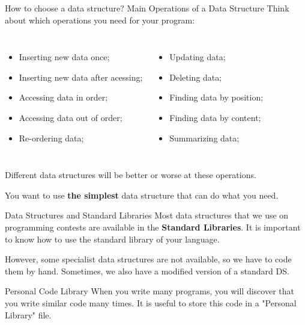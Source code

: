\begin{frame}{How to choose a data structure?}
  {Main Operations of a Data Structure}
  Think about which operations you need for your program:\medskip

  \begin{columns}
  \begin{itemize}
    \item Inserting new data once;
    \item Inserting new data after acessing;
    \item Accessing data in order;
    \item Accessing data out of order;
    \item Re-ordering data;
  \end{itemize}
  \begin{itemize}
    \item Updating data;
    \item Deleting data;
    \item Finding data by position;
    \item Finding data by content;
    \item Summarizing data;
  \end{itemize}
\end{columns}\bigskip

Different data structures will be better or
worse at these operations.\medskip

You want to use {\bf the simplest} data structure that can do what you need.
\end{frame}

\begin{frame}{Data Structures and Standard Libraries}
  Most data structures that we use on programming contests are available in the {\bf Standard Libraries}. It is important to know how to use the standard library of your language.\bigskip

  However, some specialist data structures are not available, so we have to code them by hand. Sometimes, we also have a modified version of a standard DS.\bigskip

  \begin{block}{Personal Code Library}
    When you write many programs, you will discover that you write similar code many times. It is useful to store this code in a "Personal Library" file.
  \end{block}
\end{frame}

